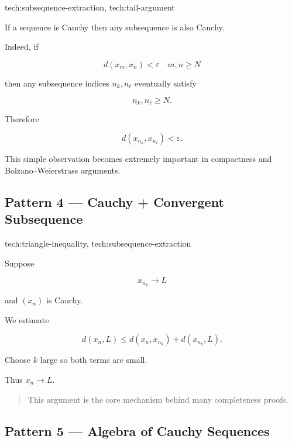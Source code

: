 \begin{remark*}[Techniques]
tech:subsequence-extraction, tech:tail-argument
\end{remark*}

If a sequence is Cauchy then any subsequence is also Cauchy.

Indeed, if

\[
d(x_m,x_n) < \varepsilon
\quad
m,n\ge N
\]

then any subsequence indices \(n_k,n_\ell\) eventually satisfy

\[
n_k,n_\ell \ge N.
\]

Therefore

\[
d(x_{n_k},x_{n_\ell}) < \varepsilon.
\]

\bigskip

This simple observation becomes extremely important in compactness and
Bolzano--Weierstrass arguments.

\subsection*{Pattern 4 — Cauchy + Convergent Subsequence}

\begin{remark*}[Techniques]
tech:triangle-inequality, tech:subsequence-extraction
\end{remark*}

Suppose

\[
x_{n_k} \to L
\]

and \((x_n)\) is Cauchy.

We estimate

\[
d(x_n,L)
\le
d(x_n,x_{n_k}) + d(x_{n_k},L).
\]

Choose \(k\) large so both terms are small.

Thus \(x_n \to L\).

\bigskip

\begin{quote}
This argument is the core mechanism behind many completeness proofs.
\end{quote}

\subsection*{Pattern 5 — Algebra of Cauchy Sequences}

